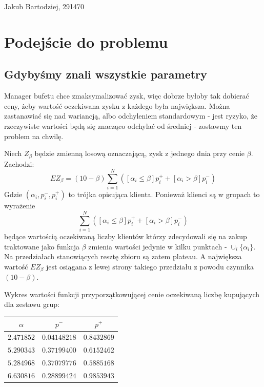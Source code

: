 \documentclass[a4paper,11pt]{article}
\begin{document}
Jakub Bartodziej, 291470
\section{Podejście do problemu}
\subsection{Gdybyśmy znali wszystkie parametry}

Manager bufetu chce zmaksymalizować zysk, więc dobrze byłoby tak dobierać ceny,
żeby wartość oczekiwana zysku z każdego była największa. Można zastanawiać się nad wariancją, 
albo odchyleniem standardowym - jest ryzyko, że rzeczywiste wartości będą się
znacząco odchylać od średniej - zostawmy ten problem na chwilę.

Niech $Z_{\beta}$ będzie zmienną losową oznaczającą, zysk z jednego dnia przy
cenie $\beta$. Zachodzi:
\[
EZ_{\beta} = (10 - \beta)\sum_{i=1}^{N}([\alpha_i \le \beta]p^+_i + [\alpha_i > \beta]p^-_i)
\]
Gdzie $(\alpha_i, p^-_i ,p^+_i)$ to trójka opisująca klienta. Ponieważ klienci są w grupach
to wyrażenie
\[
\sum_{i=1}^{N}([\alpha_i \le \beta]p^+_i + [\alpha_i > \beta]p^-_i)
\]
będące wartością oczekiwaną liczby klientów którzy zdecydowali się na zakup traktowane jako funkcja $\beta$ zmienia wartości jedynie w kilku punktach - $\cup_i\{\alpha_i\}$. Na przedziałach stanowiących resztę zbioru są zatem plateau. A największa wartość $EZ_{\beta}$
jest osiągana z lewej strony takiego przedziału z powodu czynnika $(10 - \beta)$.

Wykres wartości funkcji przyporzątkowującej cenie oczekiwaną liczbę kupujących dla
zestawu grup: \\

\begin{table}[ht] 
\centering

\begin{tabular}{c|c|c}
$\alpha$ & $p^-$ & $p^+$\\
\hline
$2.471852$ & $0.04148218$ & $0.8432869$ \\
$5.290343$ & $0.37199400$ & $0.6152462$ \\ 
$5.284968$ & $0.37079776$ & $0.5885168$ \\
$6.630816$ & $0.28899424$ & $0.9853943$
\end{tabular}

\end{table}
\end{document}
